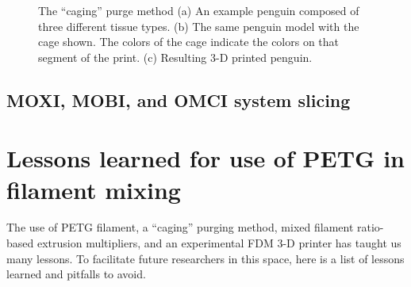 \begin{figure}
	\begin{center}
	\end{center}
	\caption{The ``caging'' purge method (a) An example penguin composed of three different tissue types. (b) The same penguin model with the cage shown. The colors of the cage indicate the colors on that segment of the print. (c) Resulting 3-D printed penguin. } 
	\label{fig:caging}
\end{figure} 

\subsection{MOXI, MOBI, and OMCI system slicing} %



\section{Lessons learned for use of PETG in filament mixing} %
The use of \ac{PETG} filament, a ``caging'' purging method, mixed filament ratio-based extrusion multipliers, and an experimental \ac{FDM} 3-D printer has taught us many lessons. To facilitate future researchers in this space, here is a list of lessons learned and pitfalls to avoid. 


